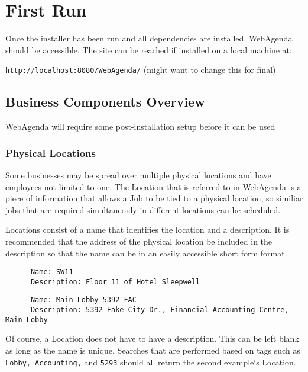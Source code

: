 \documentclass[a4paper,10pt]{report}
\begin{document}
\chapter{First Run}

\par \noindent \hspace*{1cm} Once the installer has been run and all dependencies are installed, WebAgenda should be accessible. The site can be reached if installed on a local machine at:
\begin{center}
 \texttt{http://localhost:8080/WebAgenda/} (might want to change this for final)
\end{center}


\section{Business Components Overview}
\par \noindent \hspace*{1cm} WebAgenda will require some post-installation setup before it can be used 
\subsection{Physical Locations}

\par \noindent \hspace*{1cm} Some businesses may be spread over multiple physical locations and have employees not limited to one. The Location that is referred to in WebAgenda is a piece of information that allows a Job to be tied to a physical location, so similiar jobs that are required simultaneouly in different locations can be scheduled.
\bigskip
\par \noindent \hspace*{1cm} Locations consist of a name that identifies the location and a description. It is recommended that the address of the physical location be included in the description so that the name can be in an easily accessible short form format.
\begin{verbatim}
      Name: SW11
      Description: Floor 11 of Hotel Sleepwell
\end{verbatim}

\begin{verbatim}
      Name: Main Lobby 5392 FAC 
      Description: 5392 Fake City Dr., Financial Accounting Centre, Main Lobby
\end{verbatim}

\par \noindent \hspace*{1cm} Of course, a Location does not have to have a description. This can be left blank as long as the name is unique. Searches that are performed based on tags such as \texttt{Lobby, Accounting,} and \texttt{5293} should all return the second example`s Location.
\end{document}
